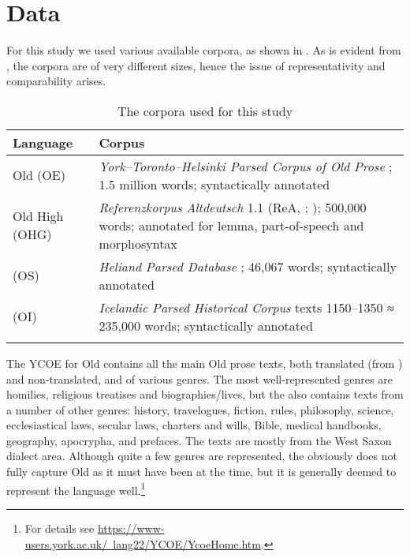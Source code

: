 \documentclass[output=paper,colorlinks,citecolor=brown,draft]{langscibook}
\begin{document}
\section{Data}\label{sectdata}

For this study we used various available corpora, as shown in . As is evident from , the corpora are of very different sizes, hence the issue of representativity and comparability arises. 

\begin{table}
\caption{The corpora used for this study}
\label{tabCorpora}
 \begin{tabularx}{\textwidth}{lQ}
  \lsptoprule
  Language          & Corpus\\
  \midrule
  Old  (OE)  &   \textit{York--Toronto--Helsinki Parsed Corpus of Old  Prose} \citep[YCOE,][]{YCOE}; 1.5 million words; syntactically annotated  \\
  \tablevspace
  Old High  (OHG)  &   \textit{Referenzkorpus Altdeutsch} 1.1 (ReA, \cite{RefKorpAltD}; \cite{Donhauser15}); 500,000 words; annotated for lemma, part-of-speech and morphosyntax \\
  \tablevspace
   (OS) & \textit{Heliand Parsed Database} \citep[HeliPaD,][]{Walkden15}; 46,067 words; syntactically annotated\\
  \tablevspace
   (OI) & \textit{Icelandic Parsed Historical Corpus} texts 1150–1350 \citep[IcePaHC,][]{IcePaHC} ≈ 235,000 words; syntactically annotated\\
  \lspbottomrule
 \end{tabularx}
\end{table}



The YCOE  for Old  contains all the main Old  prose texts, both translated (from ) and non-translated, and of various genres. The most well-represented genres are homilies, religious treatises and biographies/lives, but the  also contains texts from a number of other genres: history, travelogues, fiction, rules, philosophy, science, ecclesiastical laws, secular laws, charters and wills, Bible, medical handbooks, geography, apocrypha, and prefaces. The texts are mostly from the West Saxon dialect area. Although quite a few genres are represented, the  obviously does not fully capture Old  as it must have been at the time, but it is generally deemed to represent the language well.\footnote{For details see \href{https://www-users.york.ac.uk/~lang22/YCOE/YcoeHome.htm}{https://www-users.york.ac.uk/~lang22/YCOE/YcoeHome.htm}.}  
\end{document}
